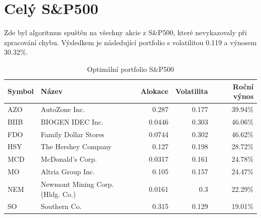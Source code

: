 \documentclass[12pt,a4paper]{report}
\begin{document}
  \clearpage
  \section{Celý S\&P500}
    Zde byl algoritmus spuštěn na všechny akcie z S\&P500, které nevykazovaly při zpracování chybu. Výsledkem je následující portfolio s volatilitou 0.119 a výnosem 30.32\%.

    \begin{table}[htb]
      \centering
      \begin{tabular}{|l|l|r|r|r|}
        \hline
        Symbol&Název&Alokace&Volatilita&Roční výnos\\\hline\hline
        AZO&AutoZone Inc. &0.287&0.177&39.94\%\\\hline
        BIIB&BIOGEN IDEC Inc. &0.0446&0.303&46.06\%\\\hline
        FDO&Family Dollar Stores &0.0744&0.302&46.62\%\\\hline
        HSY&The Hershey Company &0.127&0.198&28.72\%\\\hline
        MCD&McDonald's Corp. &0.0317&0.161&24.78\%\\\hline
        MO&Altria Group Inc. &0.105&0.157&24.47\%\\\hline
        NEM&Newmont Mining Corp. (Hldg. Co.) &0.0161&0.3&22.29\%\\\hline
        SO&Southern Co. &0.315&0.129&19.01\%\\\hline
      \end{tabular}
      \caption{Optimální portfolio S\&P500}
    \end{table}
\end{document}
